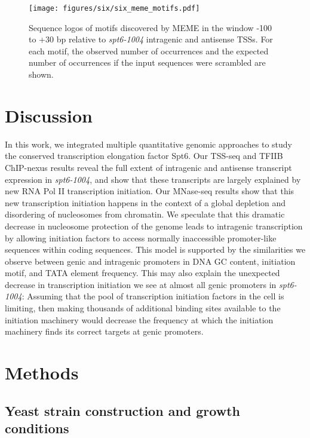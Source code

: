 \begin{figure}[h]
    \centering
    \texttt{[image: figures/six/six\_meme\_motifs.pdf]}
    \caption[Sequence logos of motifs discovered by MEME upstream of \textit{spt6-1004}-induced intragenic and antisense TSSs.]{Sequence logos of motifs discovered by MEME \citep{bailey2015} in the window -100 to +30 bp relative to \textit{spt6-1004} intragenic and antisense TSSs. For each motif, the observed number of occurrences and the expected number of occurrences if the input sequences were scrambled are shown.}
    \label{fig:six_meme_motifs}
\end{figure}

\section{Discussion}

In this work, we integrated multiple quantitative genomic approaches to study the conserved transcription elongation factor Spt6.
Our TSS-seq and TFIIB ChIP-nexus results reveal the full extent of intragenic and antisense transcript expression in \textit{spt6-1004}, and show that these transcripts are largely explained by new RNA Pol II transcription initiation.
Our MNase-seq results show that this new transcription initiation happens in the context of a global depletion and disordering of nucleosomes from chromatin.
We speculate that this dramatic decrease in nucleosome protection of the genome leads to intragenic transcription by allowing initiation factors to access normally inaccessible promoter-like sequences within coding sequences.
This model is supported by the similarities we observe between genic and intragenic promoters in DNA GC content, initiation motif, and TATA element frequency.
This may also explain the unexpected decrease in transcription initiation we see at almost all genic promoters in \textit{spt6-1004}: Assuming that the pool of transcription initiation factors in the cell is limiting, then making thousands of additional binding sites available to the initiation machinery would decrease the frequency at which the initiation machinery finds its correct targets at genic promoters.

\clearpage
\section{Methods}

\subsection{Yeast strain construction and growth conditions}

